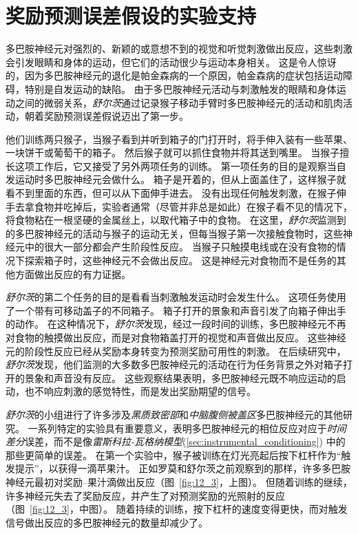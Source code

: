 \section{奖励预测误差假设的实验支持} \label{sec:experimental_support}

多巴胺神经元对强烈的、新颖的或意想不到的视觉和听觉刺激做出反应，这些刺激会引发眼睛和身体的运动，但它们的活动很少与运动本身相关。
这是令人惊讶的，因为多巴胺神经元的退化是帕金森病的一个原因，帕金森病的症状包括运动障碍，特别是自发运动的缺陷。
由于多巴胺神经元活动与刺激触发的眼睛和身体运动之间的微弱关系，\textit{舒尔茨}\cite{romo1990dopamine,schultz1990dopamine}通过记录猴子移动手臂时多巴胺神经元的活动和肌肉活动，朝着奖励预测误差假说迈出了第一步。


他们训练两只猴子，当猴子看到并听到箱子的门打开时，将手伸入装有一些苹果、一块饼干或葡萄干的箱子。
然后猴子就可以抓住食物并将其送到嘴里。
当猴子擅长这项工作后，它又接受了另外两项任务的训练。
第一项任务的目的是观察当自发运动时多巴胺神经元会做什么。
箱子是开着的，但从上面盖住了，这样猴子就看不到里面的东西，但可以从下面伸手进去。
没有出现任何触发刺激，在猴子伸手去拿食物并吃掉后，实验者通常（尽管并非总是如此）在猴子看不见的情况下，将食物粘在一根坚硬的金属丝上，以取代箱子中的食物。
在这里，\textit{舒尔茨}监测到的多巴胺神经元的活动与猴子的运动无关，但每当猴子第一次接触食物时，这些神经元中的很大一部分都会产生阶段性反应。
当猴子只触摸电线或在没有食物的情况下探索箱子时，这些神经元不会做出反应。
这是神经元对食物而不是任务的其他方面做出反应的有力证据。


\textit{舒尔茨}的第二个任务的目的是看看当刺激触发运动时会发生什么。
这项任务使用了一个带有可移动盖子的不同箱子。
箱子打开的景象和声音引发了向箱子伸出手的动作。
在这种情况下，\textit{舒尔茨}发现，经过一段时间的训练，多巴胺神经元不再对食物的触摸做出反应，而是对食物箱盖打开的视觉和声音做出反应。
这些神经元的阶段性反应已经从奖励本身转变为预测奖励可用性的刺激。
在后续研究中，\textit{舒尔茨}发现，他们监测的大多数多巴胺神经元的活动在行为任务背景之外对箱子打开的景象和声音没有反应。
这些观察结果表明，多巴胺神经元既不响应运动的启动，也不响应刺激的感觉特性，而是发出奖励期望的信号。


\textit{舒尔茨}的小组进行了许多涉及\textit{黑质致密部}和\textit{中脑腹侧被盖区}多巴胺神经元的其他研究。
一系列特定的实验具有重要意义，表明多巴胺神经元的相位反应对应于\textit{时间差分}误差，而不是像\textit{雷斯科拉-瓦格纳模型}(\ref{sec:instrumental_conditioning}) 中的那些更简单的误差。
在第一个实验中\cite{ljungberg1992responses}，猴子被训练在灯光亮起后按下杠杆作为“触发提示”，以获得一滴苹果汁。
正如罗莫和舒尔茨之前观察到的那样，许多多巴胺神经元最初对奖励--果汁滴做出反应（图~\ref{fig:12_3}，上图）。
但随着训练的继续，许多神经元失去了奖励反应，并产生了对预测奖励的光照射的反应（图~\ref{fig:12_3}，中图）。
随着持续的训练，按下杠杆的速度变得更快，而对触发信号做出反应的多巴胺神经元的数量却减少了。


